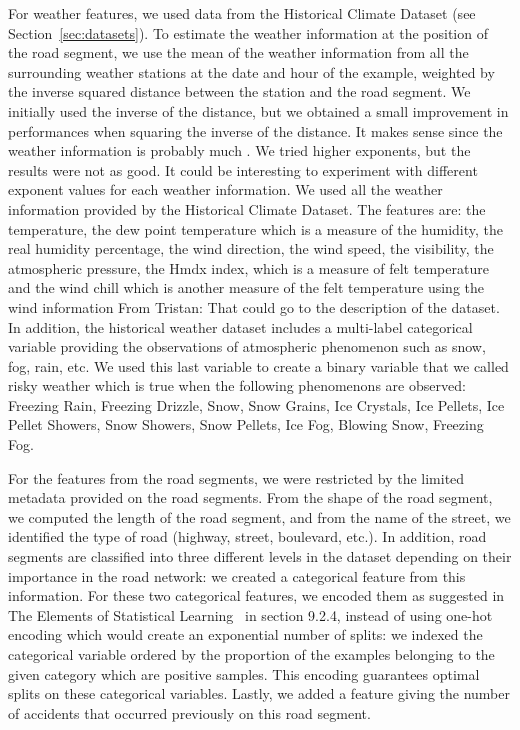 \documentclass[conference]{IEEEtran}
\newcommand{\TG}[1]{\colorlet{saved}{.}\color{orange}From Tristan: #1\color{saved}}
\newcommand{\english}[1]{\uwave{#1}}  %
\begin{document}
For weather features, we used data from the Historical Climate Dataset (see Section~\ref{sec:datasets}).
To estimate the weather information at the position of the road
segment, we use the mean of the weather information from all the
surrounding weather stations at the date and hour of the example, weighted
by the inverse squared distance between the station and the
road segment. We initially used the inverse of the distance, but we
obtained a small improvement in performances when squaring the inverse of
the distance. It makes sense since the weather information is probably much
\english{closer to the closest stations than to the other ones}. We tried higher exponents,
but the results were not as good. It could be interesting to experiment
with different exponent values for each weather information. We used all the
weather information provided by the Historical Climate Dataset. The
features are: the temperature, the dew point temperature which is a measure
of the humidity, the real humidity percentage, the wind direction, the wind
speed, the visibility, the atmospheric pressure, the Hmdx index, which is a
measure of felt temperature and the wind chill which is another measure of
the felt temperature using the wind information \TG{That could go to the description of the dataset}. In addition, the
historical weather dataset includes a multi-label categorical variable
providing the observations of atmospheric phenomenon such as snow, fog,
rain, etc. We used this last variable to create a binary variable that we
called risky weather which is true when the following phenomenons are
observed: Freezing Rain, Freezing Drizzle, Snow, Snow Grains, Ice Crystals,
Ice Pellets, Ice Pellet Showers, Snow Showers, Snow Pellets, Ice Fog,
Blowing Snow, Freezing Fog.

For the features from the road segments, we were restricted by the limited
metadata provided on the road segments. From the shape of the road segment,
we computed the length of the road segment, and from the name of the
street, we identified the type of road (highway, street, boulevard, etc.).
In addition, road segments are classified into three different levels in
the dataset depending on their importance in the road network: we created a
categorical feature from this information. For these two categorical
features, we encoded them as suggested in The Elements of Statistical
Learning~\cite{elementsofstat} in section 9.2.4, instead of using one-hot
encoding which would create an exponential number of splits: we indexed the
categorical variable ordered by the proportion of the examples belonging to
the given category which are positive samples. This encoding guarantees 
optimal splits on these categorical variables. Lastly, we added a
feature giving the number of accidents that occurred previously on this
road segment.
\end{document}
